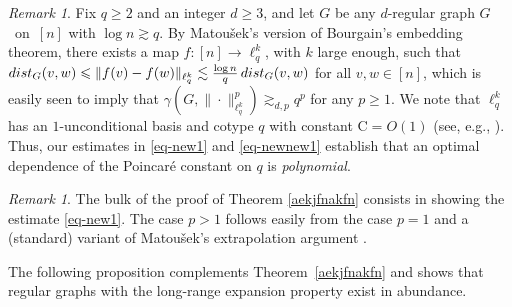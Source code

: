 \documentclass[11pt,leqno]{amsart}
\theoremstyle{remark}
\newtheorem{remark}[theorem]{Remark}
\theoremstyle{plain}
\def\dist{{\rm dist}}
\def\dist{{\rm dist}}
\begin{document}
\begin{remark} \label{rem-new1}
Fix $q\geqslant 2$ and an integer $d\geqslant 3$, and let $G$ be any $d$-regular graph $G$~on~$[n]$ with $\log n \gtrsim q$.
By Matou\v{s}ek's version \cite{Ma97} of Bourgain's embedding theorem, there exists a map $f\colon [n]\to \ell_q^k$,
with $k$ large enough, such that $\dist_G(v,w) \leqslant \|f(v)-f(w)\|_{\ell_q^k} \lesssim \frac{\log n}{q} \, \dist_G(v,w)$
for all $v,w\in [n]$, which is easily seen to imply that $\gamma(G,\|\cdot\|^p_{\ell^k_q}) \gtrsim_{d,p} q^p$
for any $p\geqslant 1$. We note that
$\ell^k_q$ has an $1$-unconditional basis and cotype $q$ with constant $\mathrm{C}=O(1)$
(see, e.g., \cite{JL01}).
Thus, our estimates in \eqref{eq-new1} and \eqref{eq-newnew1}
establish that an optimal dependence of the Poincar\'e constant
on $q$ is {\it polynomial}.
\end{remark}
\begin{remark} \label{rem-new2}
The bulk of the proof of Theorem \ref{aekjfnakfn} consists in showing the estimate \eqref{eq-new1}.
The case $p>1$ follows easily from the case $p=1$ and a (standard) variant of Matou\v{s}ek's extrapolation
argument \cite{Ma97}.
\end{remark}
The following proposition complements Theorem~\ref{aekjfnakfn} and shows that regular graphs with
the long-range expansion property exist in abundance.
\end{document}
